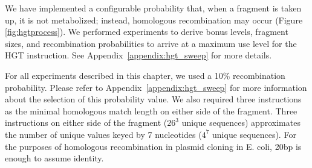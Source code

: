 \documentclass[PhD]{msu-thesis}
\begin{document}
We have implemented a configurable probability that, when a fragment is taken up, it is not metabolized;
instead, homologous recombination may occur (Figure \ref{fig:hgtprocess}). We performed experiments to derive bonus levels, fragment sizes, and recombination probabilities to arrive at a maximum use level for the HGT instruction. See Appendix~\ref{appendix:hgt_sweep} for more details. 

For all experiments described in this chapter, we used a 10\% recombination probability. Please refer to Appendix~\ref{appendix:hgt_sweep} for more information about the selection of this probability value. We also required three instructions as the minimal homologous match length on either side of the fragment. Three instructions on either side of the fragment ($26^3$ unique sequences) approximates the number of unique values keyed by 7 nucleotides ($4^7$ unique sequences). For the purposes of homologous recombination in plasmid cloning in E. coli, 20bp is enough to assume identity\cite{jacobus_optimal_2015}.   

\end{document}
